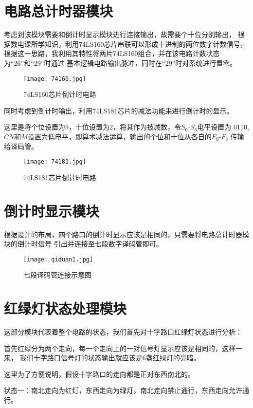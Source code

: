 \documentclass[AutoFakeBold]{LZUThesis}
\begin{document}
\section{电路总计时器模块}
考虑到该模块需要和倒计时显示模块进行连接输出，故需要个十位分别输出，
根据数电课所学知识，利用74LS160芯片串联可以形成十进制的两位数字计数信号，
根据这一思路，我利用其特性将两片74LS160组合，并在该电路计数状态为“26”和“29”时通过
基本逻辑电路输出脉冲，同时在“29”时对系统进行置零。

\begin{figure}[htbp]
    \centering
    \texttt{[image: 74160.jpg]}
    \caption{74LS160芯片倒计时电路}
\end{figure}

同时考虑到倒计时输出，利用74LS181芯片的减法功能来进行倒计时的显示。

这里是将个位设置为9，十位设置为2，将其作为被减数，令$S_0$-$S_3$电平设置为
0110,$CN$和$M$设置为低电平，即算术减法运算，输出的个位和十位从各自的$F_0$-$F_3$
传输给译码管。

\begin{figure}[htbp]
    \centering
    \texttt{[image: 74181.jpg]}
    \caption{74LS181芯片倒计时电路}
\end{figure}

\section{倒计时显示模块}
根据设计的布局，四个路口的倒计时显示应该是相同的，只需要将电路总计时器模块的倒计时信号
引出并连接至七段数字译码管即可。

\begin{figure}[htbp]
    \centering
    \texttt{[image: qiduan1.jpg]}
    \caption{七段译码管连接示意图}
\end{figure}

\section{红绿灯状态处理模块}
这部分模块代表着整个电路的状态，我们首先对十字路口红绿灯状态进行分析：

首先红绿分为两个走向，每一个走向上的一对信号灯显示应该是相同的，这样一来，
我们十字路口信号灯的状态输出就应该是6盏红绿灯的亮暗。

这里为了方便说明，假设十字路口的走向都是正对东西南北的。

状态一：南北走向为红灯，东西走向为绿灯，南北走向禁止通行，东西走向允许通行。
\end{document}
